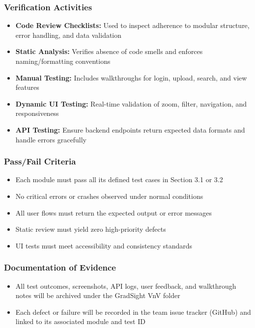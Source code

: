 \documentclass[12pt, titlepage]{article}
\begin{document}
\subsubsection*{Verification Activities}

\begin{itemize}
  \item \textbf{Code Review Checklists:} Used to inspect adherence to modular structure, error handling, and data validation
  \item \textbf{Static Analysis:} Verifies absence of code smells and enforces naming/formatting conventions
  \item \textbf{Manual Testing:} Includes walkthroughs for login, upload, search, and view features
  \item \textbf{Dynamic UI Testing:} Real-time validation of zoom, filter, navigation, and responsiveness
  \item \textbf{API Testing:} Ensure backend endpoints return expected data formats and handle errors gracefully
\end{itemize}

\subsubsection*{Pass/Fail Criteria}

\begin{itemize}
  \item Each module must pass all its defined test cases in Section 3.1 or 3.2
  \item No critical errors or crashes observed under normal conditions
  \item All user flows must return the expected output or error messages
  \item Static review must yield zero high-priority defects
  \item UI tests must meet accessibility and consistency standards
\end{itemize}

\subsubsection*{Documentation of Evidence}

\begin{itemize}
  \item All test outcomes, screenshots, API logs, user feedback, and walkthrough notes will be archived under the GradSight VnV folder
  \item Each defect or failure will be recorded in the team issue tracker (GitHub) and linked to its associated module and test ID
\end{itemize}
\end{document}
